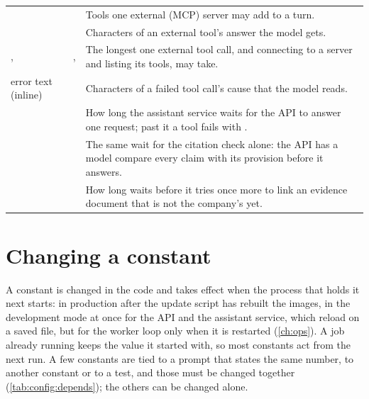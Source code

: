 \begin{xltabular}{\textwidth}{@{}L{44mm}L{19mm}Y@{}}
 &  & Tools one external (MCP) server may add to a turn. \\
 &  & Characters of an external tool's answer the model gets. \\
,  & ,  & The longest one external tool call, and connecting to a server and listing its tools, may take. \\
error text (inline) &  & Characters of a failed tool call's cause that the model reads. \\
 &  & How long the assistant service waits for the API to answer one request; past it a tool fails with . \\
 &  & The same wait for the citation check alone: the API has a model compare every claim with its provision before it answers. \\
 &  & How long  waits before it tries once more to link an evidence document that is not the company's yet. \\
\end{xltabular}


\section{Changing a constant}\label{sec:config:change}

A constant is changed in the code and takes effect when the process that holds it next
starts: in production after the update script has rebuilt the images, in the development mode
at once for the API and the assistant service, which reload on a saved file, but for the worker
loop only when it is restarted (\cref{ch:ops}). A job already running keeps the value it
started with, so most constants act from the next run. A few constants are
tied to a prompt that states the same number, to another constant or to a test, and those must
be changed together (\cref{tab:config:depends}); the others can be changed alone.

